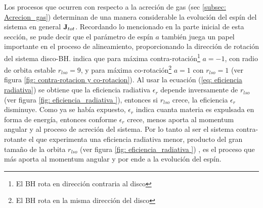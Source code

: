Los procesos que ocurren con respecto a la acreción de gas (sec \ref{subsec: Acrecion_gas}) determinan de una manera considerable la evolución del espín del sistema en general ${\bf{J}}_{tot}$. Recordando lo mencionado en la parte inicial de esta sección, se pude decir que el parámetro de espín $a$ también juega un papel importante en el proceso de alineamiento, proporcionando la dirección de rotación del sistema disco-BH. \cite{king2005} indica que para máxima contra-rotación\footnote{El BH rota en dirección contraria al disco} $a=-1$, con radio de orbita estable $r_{lso}=9$, y para máxima co-rotación\footnote{El BH rota en la misma dirección del disco} $a=1$ con $r_{lso}=1$ (ver figura \ref{fig: contra-rotacion y co-rotacion}). %
Al usar la ecuación (\ref{eq: eficiencia radiativa}) se obtiene que la eficiencia radiativa $\epsilon_{r}$ depende inversamente de $r_{lso}$ (ver figura \ref{fig: eficiencia_radiativa }), entonces si $r_{lso}$ crece, la eficiencia $\epsilon_{r}$ disminuye. Como ya se había expuesto, $\epsilon_{r}$ indica cuanta materia es expulsada en forma de energía, entonces conforme $\epsilon_{r}$ crece, menos aporta al momentum angular y al proceso de acreción del sistema. Por lo tanto al ser el sistema contra-rotante el que experimenta una eficiencia radiativa menor, producto del  gran tamaño de la orbita $r_{lso}$ (ver figura \ref{fig: eficiencia_radiativa }) 
, es el proceso que más aporta al momentum angular y por ende a la evolución del espín. 

